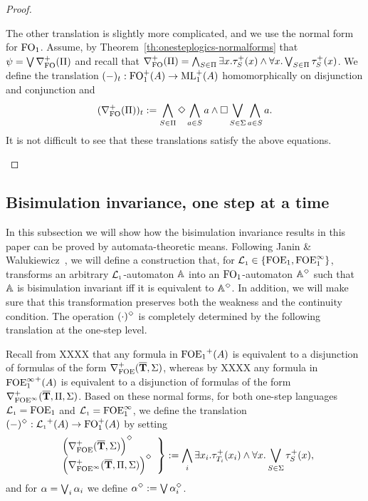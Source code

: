 \begin{proof}
\begin{pfclaim}
	The other translation is slightly more complicated, and we use the normal form for $\mathrm{FO}_1$. Assume, by Theorem~\ref{th:onesteplogics-normalforms} that $\psi = \bigvee \nabla^+_{\mathrm{FO}}(\Pi)$ and recall that $\nabla^+_{\mathrm{FO}}(\Pi) = \bigwedge_{S\in\Pi} \exists x. \tau^+_S(x) \land \forall x. \bigvee_{S\in\Pi} \tau^+_S(x)$. We define the translation $(-)_t:\mathrm{FO}_1^+(A) \to \mathrm{ML}_1^+(A)$ homomorphically on disjunction and conjunction and
	\[
		(\nabla^+_{\mathrm{FO}}(\Pi))_t := \bigwedge_{S\in\Pi} \Diamond \bigwedge_{a\in S} a \land \square \bigvee_{S\in\Sigma} \bigwedge_{a\in S} a.
	\]
	It is not difficult to see that these translations satisfy the above equations.
\end{pfclaim}
\end{proof}



\subsection{Bisimulation invariance, one step at a time}
\label{ss:bisinv}

In this subsection we will show how the bisimulation invariance results in this
paper can be proved by automata-theoretic means.
Following Janin \& Walukiewicz~\cite{jani:xxxxxx}, 
we will define a construction that, for $\mathcal{L}_{\scriptscriptstyle 1} \in \{{\mathrm{FOE}_1},{\mathrm{FOE}^{\infty}_1}\}$, 
transforms an arbitrary $\mathcal{L}_{\scriptscriptstyle 1}$-automaton $\mathbb{A}$ into an $\mathrm{FO}_1$-automaton 
$\mathbb{A}^{\Diamond}$ such that $\mathbb{A}$ is bisimulation invariant iff it is equivalent
to $\mathbb{A}^{\Diamond}$.
In addition, we will make sure that this transformation preserves both the
weakness and the continuity condition.
The operation $(\cdot)^{\Diamond}$ is completely determined by the following 
translation at the one-step level.
\begin{definition}
Recall from XXXX that any formula in ${\mathrm{FOE}_1}^+(A)$ is equivalent to a 
disjunction of formulas of the form $\nabla^+_{\mathrm{FOE}}(\overline{{\mathbf{T}}},\Sigma)$, whereas
by XXXX any formula in ${\mathrm{FOE}^{\infty}_1}^+(A)$ is 
equivalent to a disjunction of formulas of the form 
$\nabla^+_{{\mathrm{FOE}}^\infty}(\overline{{\mathbf{T}}},\Pi,\Sigma)$. 
Based on these normal forms, for both one-step languages $\mathcal{L}_{\scriptscriptstyle 1}={\mathrm{FOE}_1}$ and 
$\mathcal{L}_{\scriptscriptstyle 1}={\mathrm{FOE}^{\infty}_1}$, we define the translation 
$(-)^{\Diamond} : {\mathcal{L}_{\scriptscriptstyle 1}}^+(A) \to \mathrm{FO}_1^+(A)$ by setting
\[
\left.\begin{array}{l}
   \Big( \nabla^+_{\mathrm{FOE}}(\overline{{\mathbf{T}}},\Sigma) \Big)^{\Diamond} 
\\ \Big( \nabla^+_{{\mathrm{FOE}}^\infty}(\overline{{\mathbf{T}}},\Pi,\Sigma) \Big)^{\Diamond} 
\end{array}\right\}
\mathrel{: =} \bigwedge_{i} \exists x_i. \tau^+_{T_i}(x_i) \land 
\forall x. \bigvee_{S\in\Sigma} \tau^+_S(x),
\]
and for $\alpha = \bigvee_{i} \alpha_{i}$ we define $\alpha^{\Diamond} \mathrel{: =} \bigvee 
\alpha_{i}^{\Diamond}$.
\end{definition}

